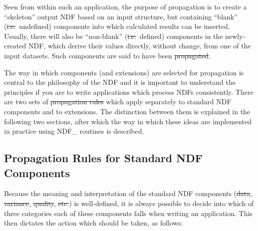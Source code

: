 Seen from within such an application, the purpose of propagation is to
create a ``skeleton'' output NDF based on an input structure, but containing
``blank'' (\st{i.e.}\ undefined) components into which calculated results
can be inserted. 
Usually, there will also be ``non-blank'' (\st{i.e.}\ defined) components
in the newly-created NDF, which derive their values directly, without
change, from one of the input datasets. 
Such components are said to have been \st{propagated}.

The way in which components (and extensions) are selected for propagation is
central to the philosophy of the NDF and it is important to understand the 
principles if you are to write applications which process NDFs consistently.
There are two sets of \st{propagation rules\/} which apply separately to
standard NDF components and to extensions. 
The distinction between them is explained in the following two sections,
after which the way in which these ideas are implemented in practice using 
NDF\_ routines is described. 

\subsection{\label{ss:propstandard}Propagation Rules for Standard NDF Components}

Because the meaning and interpretation of the standard NDF components
(\st{data}, \st{variance}, \st{quality}, \st{etc.}) is
well-defined, it is always 
possible to decide into which of three categories each of these components falls
when writing an application. 
This then dictates the action which should be taken, as follows:

